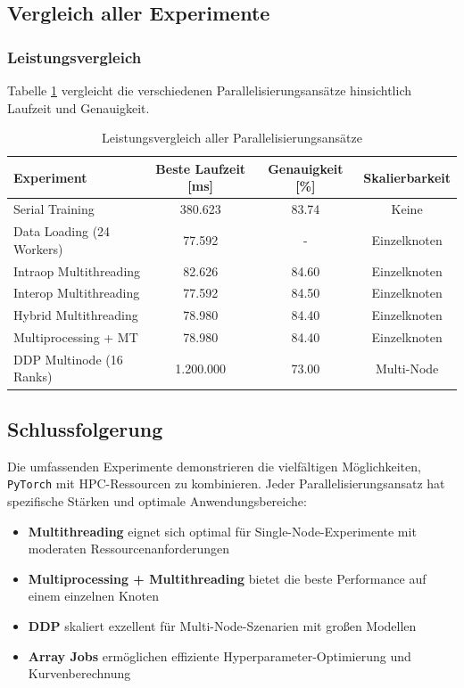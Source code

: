 \documentclass{article}
\begin{document}
\subsection{Vergleich aller Experimente}
\subsubsection{Leistungsvergleich}
Tabelle \ref{tab:performance_comparison} vergleicht die verschiedenen Parallelisierungsansätze hinsichtlich Laufzeit und Genauigkeit.

\begin{table}[H]
\centering
\caption{Leistungsvergleich aller Parallelisierungsansätze}
\label{tab:performance_comparison}
\begin{tabular}{lccc}
\toprule
\textbf{Experiment} & \textbf{Beste Laufzeit [ms]} & \textbf{Genauigkeit [\%]} & \textbf{Skalierbarkeit} \\
\midrule
Serial Training & 380.623 & 83.74 & Keine \\
Data Loading (24 Workers) & 77.592 & - & Einzelknoten \\
Intraop Multithreading & 82.626 & 84.60 & Einzelknoten \\
Interop Multithreading & 77.592 & 84.50 & Einzelknoten \\
Hybrid Multithreading & 78.980 & 84.40 & Einzelknoten \\
Multiprocessing + MT & 78.980 & 84.40 & Einzelknoten \\
DDP Multinode (16 Ranks) & 1.200.000 & 73.00 & Multi-Node \\
\bottomrule
\end{tabular}
\end{table}


\subsection{Schlussfolgerung}
Die umfassenden Experimente demonstrieren die vielfältigen Möglichkeiten, \texttt{PyTorch} mit HPC-Ressourcen zu kombinieren. 
Jeder Parallelisierungsansatz hat spezifische Stärken und optimale Anwendungsbereiche:

\begin{itemize}
\item \textbf{Multithreading} eignet sich optimal für Single-Node-Experimente mit moderaten Ressourcenanforderungen
\item \textbf{Multiprocessing + Multithreading} bietet die beste Performance auf einem einzelnen Knoten
\item \textbf{DDP} skaliert exzellent für Multi-Node-Szenarien mit großen Modellen
\item \textbf{Array Jobs} ermöglichen effiziente Hyperparameter-Optimierung und Kurvenberechnung
\end{itemize}
\end{document}
